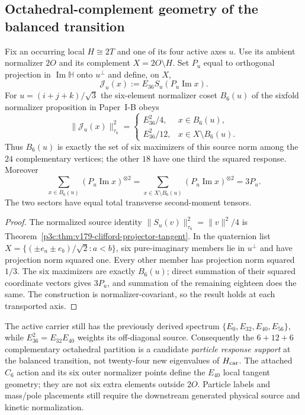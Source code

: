 \documentclass[12pt,a4paper]{article}
\begin{document}
\subsection{Octahedral-complement geometry of the balanced transition}
\label{p3c:sec:v189-octahedral-transition}
\begin{theorem}
\label{p3c:thm:v189-octahedral-e36-selector}
Fix an occurring local $H\cong2T$ and one of its four active axes $u$.
Use its ambient normalizer $2O$ and its complement $X=2O\setminus H$.
Set $P_u$ equal to orthogonal projection in
$\operatorname{Im}\mathbb H$ onto $u^\perp$ and define, on $X$,
\[
 \mathcal J_u(x):=E_{36}S_u(P_u\operatorname{Im}x).
\]
For $u=(i+j+k)/\sqrt3$ the six-element normalizer coset
$B_6(u)$ of the sixfold normalizer proposition in Paper~I-B
obeys
\[
 \boxed{\|\mathcal J_u(x)\|_{\tau_8}^2=
 \begin{cases}E_{36}^2/4,&x\in B_6(u),\\
 E_{36}^2/12,&x\in X\setminus B_6(u).
 \end{cases}}
\]
Thus $B_6(u)$ is exactly the set of six maximizers of this
source norm among the $24$ complementary vertices; the other
$18$ have one third the squared response.  Moreover
\[
 \sum_{x\in B_6(u)}(P_u\operatorname{Im}x)^{\otimes2}
 =\sum_{x\in X\setminus B_6(u)}(P_u\operatorname{Im}x)^{\otimes2}
 =3P_u.
\]
The two sectors have equal total transverse second-moment tensors.
\end{theorem}
\begin{proof}
The normalized source identity
$\|S_u(v)\|_{\tau_8}^2=\|v\|^2/4$ is
Theorem~\ref{p3c:thm:v179-clifford-projector-tangent}.
In the quaternion list $X=\{(\pm e_a\pm e_b)/\sqrt2:a<b\}$,
six pure-imaginary members lie in $u^\perp$ and have projection
norm squared one.  Every other member has projection norm squared
$1/3$.  The six maximizers are exactly $B_6(u)$; direct summation
of their squared coordinate vectors gives $3P_u$, and summation
of the remaining eighteen does the same.  The construction is
normalizer-covariant, so the result holds at each transported axis.
\end{proof}
\begin{remark}
\label{p3c:rem:v189-octahedral-clock-scope}
The active carrier still has the previously derived spectrum
$\{E_0,E_{32},E_{40},E_{56}\}$, while
$E_{36}^2=E_{32}E_{40}$ weights its off-diagonal source.
Consequently the $6+12+6$ complementary octahedral partition is a
candidate \emph{particle response support} at the balanced transition,
not twenty-four new eigenvalues of $H_{\rm car}$.
The attached $C_6$ action and its six outer normalizer points define
the $E_{40}$ local tangent geometry; they are not six extra elements
outside $2O$.  Particle labels and mass/pole placements still require
the downstream generated physical source and kinetic normalization.
\end{remark}
\end{document}
